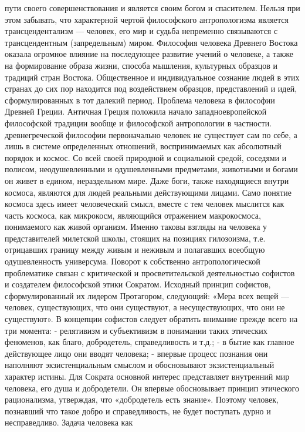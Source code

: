 \documentclass[12pt]{article}
\begin{document}
пути  своего  совершенствования  и  является  своим  богом  и  спасителем.  Нельзя  при  этом  забывать,  что
характерной чертой философского антропологизма является трансцендентализм — человек, его мир и судьба
непременно связываются с трансцендентным (запредельным) миром.
Философия человека Древнего Востока оказала огромное влияние на последующее развитие учений о человеке,
а также на формирование образа жизни, способа мышления, культурных образцов и традиций стран Востока.
Общественное и  индивидуальное сознание  людей в этих странах до  сих  пор находится под  воздействием
образцов, представлений и идей, сформулированных в тот далекий период.
Проблема человека в философии Древней Греции.
Античная  Греция  положила  начало  западноевропейской  философской  традиции  вообще  и  философской
антропологии в частности. древнегреческой философии первоначально человек не существует сам по себе, а
лишь в системе определенных отношений, воспринимаемых как абсолютный порядок и космос. Со всей своей
природной  и  социальной  средой,  соседями  и  полисом,  неодушевленными  и  одушевленными  предметами,
животными и богами он живет в едином, нераздельном мире. Даже боги, также находящиеся внутри космоса,
являются  для  людей  реальными  действующими  лицами.  Само  понятие  космоса  здесь  имеет  человеческий
смысл,  вместе  с  тем  человек  мыслится  как  часть  космоса,  как  микрокосм,  являющийся  отражением
макрокосмоса,  понимаемого  как  живой  организм.  Именно  таковы  взгляды  на  человека  у  представителей
милетской школы, стоящих на позициях гилозоизма, т.е. отрицавших границу между живым и неживым и
полагавших всеобщую одушевленность универсума.
Поворот  к  собственно  антропологической  проблематике  связан  с  критической  и  просветительской
деятельностью софистов и создателем философской этики Сократом.
Исходный принцип софистов, сформулированный их лидером Протагором, следующий: «Мера всех вещей —
человек, существующих, что они существуют, а несуществующих, что они не существуют».
В концепции софистов следует обратить внимание прежде всего на три момента:
- релятивизм и субъективизм в понимании таких этических феноменов, как благо, добродетель, справедливость  
и т.д.;
- в бытие как главное действующее лицо они вводят человека;
- впервые процесс познания они наполняют экзистенциальным смыслом и обосновывают экзистенциальный
характер истины.
Для Сократа основной интерес представляет внутренний мир человека, его душа и добродетели. Он впервые
обосновывает принцип этического рационализма, утверждая, что «добродетель есть знание». Поэтому человек,
познавший что такое добро и справедливость, не будет поступать дурно и несправедливо. Задача человека как
\end{document}
